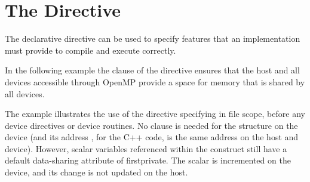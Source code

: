 \pagebreak
\section{The  Directive}
\label{sec:requires}

The declarative  directive can be used to 
specify features that an implementation must provide to compile and 
execute correctly.

In the following example the  clause 
of the  directive ensures that the host and all 
devices accessible through OpenMP provide a  space
for memory that is shared by all devices.

The example illustrates the use of the  directive specifying
 in file scope, before any device 
directives or device routines. No  clause is needed for
the  structure on the device (and its address , for the C++ code,
is the same address on the host and device).
However, scalar variables referenced within the 
construct still have a default data-sharing attribute of firstprivate.
The  scalar is incremented on the device, and its change is
not updated on the host.



